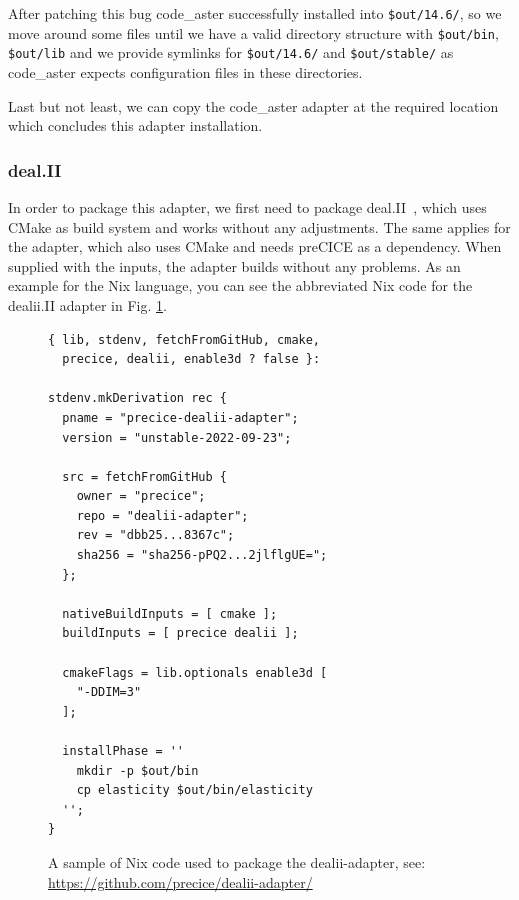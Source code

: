 \documentclass{eceasst}
\begin{document}
After patching this bug code\_aster successfully installed into \texttt{\$out/14.6/}, so we move around some files until we have a valid directory structure with \texttt{\$out/bin}, \texttt{\$out/lib} and we provide symlinks for \texttt{\$out/14.6/} and \texttt{\$out/stable/} as code\_aster expects configuration files in these directories.

Last but not least, we can copy the code\_aster adapter at the required location which concludes this adapter installation.\\

\subsubsection{deal.II}

In order to package this adapter, we first need to package deal.II~\cite{dealII95}, which uses CMake as build system and works without any adjustments.
The same applies for the adapter, which also uses CMake and needs preCICE as a dependency.
When supplied with the inputs, the adapter builds without any problems.
As an example for the Nix language, you can see the abbreviated Nix code for the dealii.II adapter in Fig. \ref{lst:dealii-adapter-nix}.\\

\begin{figure}
    \normalsize
    \begin{verbatim}
{ lib, stdenv, fetchFromGitHub, cmake,
  precice, dealii, enable3d ? false }:

stdenv.mkDerivation rec {
  pname = "precice-dealii-adapter";
  version = "unstable-2022-09-23";

  src = fetchFromGitHub {
    owner = "precice";
    repo = "dealii-adapter";
    rev = "dbb25...8367c";
    sha256 = "sha256-pPQ2...2jlflgUE=";
  };

  nativeBuildInputs = [ cmake ];
  buildInputs = [ precice dealii ];

  cmakeFlags = lib.optionals enable3d [
    "-DDIM=3"
  ];

  installPhase = ''
    mkdir -p $out/bin
    cp elasticity $out/bin/elasticity
  '';
}
    \end{verbatim}
    \caption{A sample of Nix code used to package the dealii-adapter, see: \url{https://github.com/precice/dealii-adapter/}}
    \label{lst:dealii-adapter-nix}
    \hrulefill
    \vspace*{4pt}
\end{figure}
\end{document}
